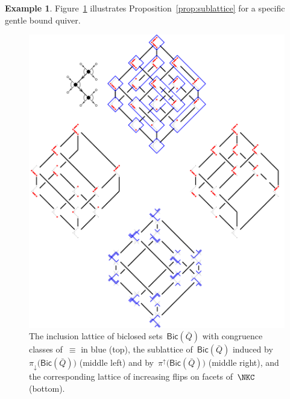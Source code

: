 \documentclass{memo-l}
\theoremstyle{definition}
\newtheorem{example}[theorem]{Example}
\newcommand{\fref}[1]{Figure~\ref{#1}} %
\newcommand{\Bicl}[1]{\mathsf{Bic}(#1)} %
\newcommand{\projDown}{\pi_\downarrow} %
\newcommand{\projUp}{\pi^\uparrow} %
\begin{document}
\begin{example}
\fref{fig:exmSublattice} illustrates Proposition~\ref{prop:sublattice} for a specific gentle bound quiver.


\begin{figure}[p]
	\capstart
	\centerline{\includegraphics[width=1.3\textwidth]{exmSublatticeVertical}}
	\caption{The inclusion lattice of biclosed sets~$\Bicl{\bar Q}$ with congruence classes of~$\equiv$ in blue (top), the sublattice of~$\Bicl{\bar Q}$ induced by~$\projDown \big( \Bicl{\bar Q} \big)$ (middle left) and by~$\projUp \big( \Bicl{\bar Q} \big)$ (middle right), and the corresponding lattice of increasing flips on facets of~$\NKC$ (bottom).}
	\label{fig:exmSublattice}
\end{figure}
\end{example}
\end{document}
